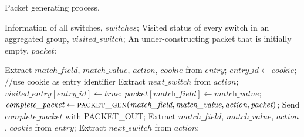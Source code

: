 \begin {tcolorbox}[blanker,float=tbp,
grow to left by=1cm, grow to right by=1cm]
\begin{algorithm}[H]

  \caption{Packet generating process.}
  \begin{algorithmic}[1]
    \Require
      Information of all switches, $switches$;
      Visited status of every switch in an aggregated group, $visited\_switch$;
      An under-constructing packet that is initially empty, $packet$; 

          \State Extract $match\_field$, $match\_value$, $action$, $cookie$ from $entry$;
          \State $entry\_id \gets \textit{cookie}$; //use cookie as entry identifier
          \State 
          \State Extract $next\_switch$ from $action$;
            \State $\textit{visited\_entry}[\textit{entry\_id}] \gets true$;
            \State $packet[\textit{match\_field}] \gets \textit{match\_value}$;
            \State $\textit{complete\_packet} \gets \Call{packet\_gen}{\textit{match\_field}, \textit{match\_value}, \textit{action}, \textit{packet}}$;
            \State Send $\textit{complete\_packet}$ with PACKET\_OUT;
          \EndIf
      \EndFor
        \EndFor
    \EndFunction
    \State
        \State Extract $match\_field$, $match\_value$, $action$, $cookie$ from $entry$;
        \State Extract $next\_switch$ from $action$; 
  \end{algorithmic}
\end{algorithm}
\end{tcolorbox}

